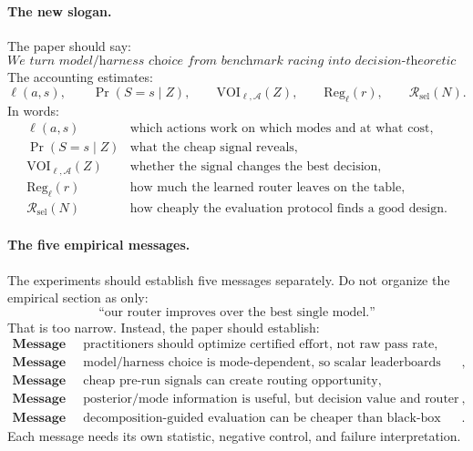 \documentclass{article}
\begin{document}
\paragraph{The new slogan.}
The paper should say:
\[
    \boxed{
    \textit{We turn model/harness choice from benchmark racing into
    decision-theoretic performance accounting.}
    }
\]
The accounting estimates:
\[
    \ell(a,s),\qquad
    \Pr(S=s\mid Z),\qquad
    \mathrm{VOI}_{\ell,\mathcal A}(Z),\qquad
    \mathrm{Reg}_{\ell}(r),\qquad
    \mathcal R_{\mathrm{sel}}(N).
\]
In words:
\[
\begin{array}{ll}
    \ell(a,s) & \text{which actions work on which modes and at what cost},\\
    \Pr(S=s\mid Z) & \text{what the cheap signal reveals},\\
    \mathrm{VOI}_{\ell,\mathcal A}(Z) & \text{whether the signal changes the best decision},\\
    \mathrm{Reg}_{\ell}(r) & \text{how much the learned router leaves on the table},\\
    \mathcal R_{\mathrm{sel}}(N) & \text{how cheaply the evaluation protocol finds a good design}.
\end{array}
\]

\paragraph{The five empirical messages.}
The experiments should establish five messages separately.
Do not organize the empirical section as only:
\[
    \text{``our router improves over the best single model.''}
\]
That is too narrow.
Instead, the paper should establish:
\[
\begin{array}{ll}
    \textbf{Message 1} &
    \text{practitioners should optimize certified effort, not raw pass rate},\\
    \textbf{Message 2} &
    \text{model/harness choice is mode-dependent, so scalar leaderboards hide structure},\\
    \textbf{Message 3} &
    \text{cheap pre-run signals can create routing opportunity},\\
    \textbf{Message 4} &
    \text{posterior/mode information is useful, but decision value and router regret
    are deployment-relevant},\\
    \textbf{Message 5} &
    \text{decomposition-guided evaluation can be cheaper than black-box racing}.
\end{array}
\]
Each message needs its own statistic, negative control, and failure interpretation.
\end{document}
